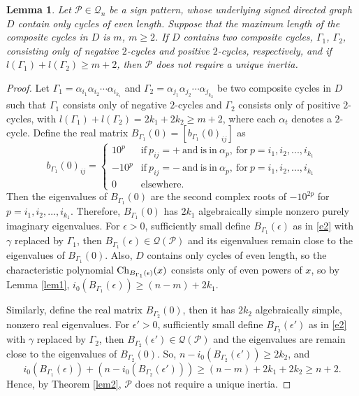 \documentclass[a4paper, 10pt]{article}
\newtheorem{lemma}{Lemma}[section]
\numberwithin{equation}{section}
\def\Ch{{\rm Ch}}
\begin{document}
\begin{lemma}\label{xnl2}
	Let $\mathcal{P} \in \mathcal{Q}_n$ be a sign pattern, whose underlying signed directed graph $D$ contain only cycles of even length. Suppose that the maximum length of the composite cycles in $D$ is $m$, $m \geq 2$. If $D$ contains two composite cycles, $\Gamma_1$, $\Gamma_2$, consisting only of negative $2$-cycles and positive $2$-cycles, respectively, and if $l(\Gamma_1)+l(\Gamma_2)\geq m+2$, then $\mathcal{P}$ does not require a unique inertia.
\end{lemma}
\begin{proof}
	Let $\Gamma_1 = \alpha_{i_1} \alpha_{i_2} \cdots \alpha_{i_{k_1}}$ and $\Gamma_2 = \alpha_{j_1} \alpha_{j_2} \cdots \alpha_{j_{k_2}}$ be two composite cycles in $D$ such that $\Gamma_1$ consists only of negative $2$-cycles and $\Gamma_2$ consists only of positive $2$-cycles, with $l(\Gamma_1)+l(\Gamma_2)=2k_1+2k_2\geq m+2$, where each $\alpha_t$ denotes a $2$-cycle.   Define the real matrix $B_{\Gamma_1}(0)=[b_{\Gamma_1}(0)_{ij}]$ as
	$$b_{\Gamma_1}(0)_{ij}= \begin{cases}
		10^p & \text{if}\ p_{ij}=+~\text{and}~ \text{is}~
		\text{in}~ \alpha_p,~\text{for}~p=i_1,i_2,...,i_{k_1} \\
		-10^p & \text{if}\ p_{ij}=-~\text{and}~ \text{is}~ \text{in}~ \alpha_p,~\text{for}~p=i_1,i_2,...,i_{k_1} \\
		
		0 & \text{elsewhere.}
	\end{cases}$$
	Then the eigenvalues of $B_{\Gamma_1}(0)$ are the second complex roots of $-10^{2p}$ for $p=i_1,i_2,...,i_{k_1}$. Therefore, %
	$B_{\Gamma_1}(0)$ has $2k_1$ algebraically simple nonzero purely imaginary eigenvalues. For $\epsilon>0$, sufficiently small define $B_{\Gamma_1}(\epsilon)$ as in \eqref{e2} with $\gamma$ replaced by $\Gamma_1$, then $B_{\Gamma_1}(\epsilon)\in \mathcal{Q}(\mathcal{P})$ and its eigenvalues remain close to the eigenvalues of $B_{\Gamma_1}(0)$. Also, $D$ contains only cycles of even length, so the characteristic polynomial $\Ch_{B_{\Gamma_1}(\epsilon)}(x)$ consists only of even powers of $x$, so by Lemma \ref{lem1}, $i_0(B_{\Gamma_1}(\epsilon))\geq (n-m)+2k_1$.
	
	Similarly, define the real matrix $B_{\Gamma_2}(0)$, then it has $2k_2$ algebraically simple, nonzero real eigenvalues. For $\epsilon'>0$, sufficiently small define $B_{\Gamma_2}(\epsilon')$ as in \eqref{e2} with $\gamma$ replaced by $\Gamma_2$, then $B_{\Gamma_2}(\epsilon')\in \mathcal{Q}(\mathcal{P})$ and the eigenvalues are remain close to the eigenvalues of $B_{\Gamma_2}(0)$. So, $n-i_0(B_{\Gamma_2}(\epsilon'))\geq 2k_2$, and $$i_0(B_{\Gamma_1}(\epsilon))+(n-i_0(B_{\Gamma_2}(\epsilon')))\geq (n-m)+2k_1+2k_2\geq n+2.$$ Hence, by Theorem \ref{lem2}, $\mathcal{P}$ does not require a unique inertia.
\end{proof}
\end{document}
